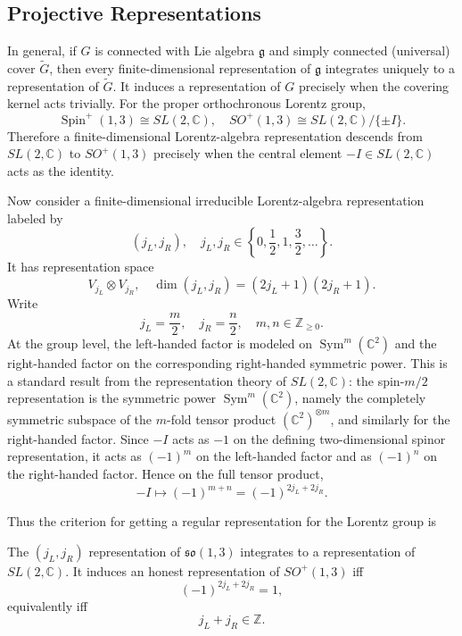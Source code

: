 \subsection{Projective Representations}
\label{subsec:projective-representations}

In general, if $G$ is connected with Lie algebra $\mathfrak{g}$ and simply connected (universal) cover $\widetilde G$, then every finite-dimensional representation of $\mathfrak{g}$ integrates uniquely to a representation of $\widetilde G$. It induces a representation of $G$ precisely when the covering kernel acts trivially. For the proper orthochronous Lorentz group,
\[
    \operatorname{Spin}^+(1,3) \cong SL(2,\mathbb{C}), \quad
    SO^+(1,3) \cong SL(2,\mathbb{C}) / \{\pm I\}.
\]
Therefore a finite-dimensional Lorentz-algebra representation descends from $SL(2,\mathbb{C})$ to $SO^+(1,3)$ precisely when the central element $-I \in SL(2,\mathbb{C})$ acts as the identity.

Now consider a finite-dimensional irreducible Lorentz-algebra representation labeled by
\[
    (j_L,j_R), \quad j_L,j_R \in \left\{0,\frac12,1,\frac32,\ldots\right\}.
\]
It has representation space
\[
    V_{j_L} \otimes V_{j_R}, \quad
    \dim(j_L,j_R) = (2j_L+1)(2j_R+1).
\]
Write
\[
    j_L = \frac{m}{2}, \quad j_R = \frac{n}{2}, \quad m,n \in \mathbb{Z}_{\geq 0}.
\]
At the group level, the left-handed factor is modeled on $\operatorname{Sym}^m(\mathbb{C}^2)$ and the right-handed factor on the corresponding right-handed symmetric power.
This is a standard result from the representation theory of $SL(2,\mathbb{C})$: the spin-$m/2$ representation is the symmetric power $\operatorname{Sym}^m(\mathbb{C}^2)$, namely the completely symmetric subspace of the $m$-fold tensor product $(\mathbb{C}^2)^{\otimes m}$, and similarly for the right-handed factor.
Since $-I$ acts as $-1$ on the defining two-dimensional spinor representation, it acts as $(-1)^m$ on the left-handed factor and as $(-1)^n$ on the right-handed factor. Hence on the full tensor product,
\[
    -I \mapsto (-1)^{m+n} = (-1)^{2j_L+2j_R}.
\]

Thus the criterion for getting a regular representation for the Lorentz group is
\begin{fact}
    The $(j_L,j_R)$ representation of $\mathfrak{so}(1,3)$ integrates to a representation of $SL(2,\mathbb{C})$. It induces an honest representation of $SO^+(1,3)$ iff
    \[
        (-1)^{2j_L+2j_R} = 1,
    \]
    equivalently iff
    \[
        j_L + j_R \in \mathbb{Z}.
    \]
\end{fact}

